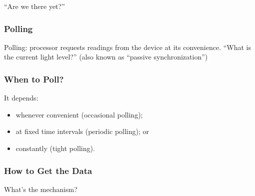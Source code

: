 \begin{frame}

\Huge
\begin{center}
``Are we there yet?''
\end{center}


\end{frame}

\begin{frame}
\frametitle{Polling}

\Large
\begin{changemargin}{2cm}
Polling: processor requests readings from
the device at its convenience.  \vfill
``What is the current light level?''\vfill
(also known as ``passive synchronization'')
\end{changemargin}

\end{frame}

\begin{frame}
\frametitle{When to Poll?}

\large
\begin{changemargin}{2cm}
It depends:

\begin{itemize}
\item whenever convenient (occasional polling);
\item at fixed time intervals (periodic polling); or
\item constantly (tight polling).
\end{itemize}
\end{changemargin}

\end{frame}

\begin{frame}
\frametitle{How to Get the Data}

\begin{center}
\end{center}

\large 
\begin{changemargin}{2cm} \vspace*{1em} What's the mechanism?

\end{changemargin}


\end{frame}

